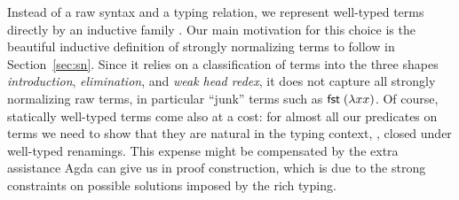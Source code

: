 Instead of a raw syntax and a typing relation, we represent well-typed
terms directly by an inductive family
\citep{dybjer:inductiveFamilies}.
Our main motivation for this
choice is the beautiful inductive definition of strongly normalizing terms to
follow in Section~\ref{sec:sn}.  Since it relies on a classification
of terms into the three shapes \emph{introduction},
\emph{elimination}, and \emph{weak head redex}, it does not capture all strongly normalizing raw terms, in particular
``junk'' terms such as $\mathsf{fst}\;(\lambda x x)$.  Of
course, statically well-typed terms come also at a cost: for almost all
our predicates on terms we need to show that they are natural in the
typing context, \ie, closed under well-typed renamings.  This expense
might be compensated by the extra assistance Agda can give us in
proof construction, which is due to the strong constraints on possible
solutions imposed by the rich typing.





